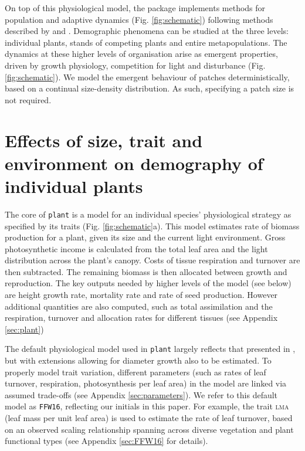 \documentclass[a4paper,11pt]{article}
\newcommand{\plant}{\texttt{plant}}
\begin{document}
On top of this physiological model, the package implements methods for
population and adaptive dynamics (Fig.  \ref{fig:schematic}) following methods
described by \citet{Falster-2011} and \citet{Falster-2015}. Demographic
phenomena can be studied at the three levels: individual plants, stands of
competing plants and entire metapopulations. The dynamics at these higher
levels of organisation arise as emergent properties, driven by growth
physiology, competition for light and disturbance (Fig.  \ref{fig:schematic}).
We model the emergent behaviour of patches deterministically, based on a
continual  size-density distribution. As such, specifying a patch size
is not required.

\section{Effects of size, trait and environment on demography of individual plants}

The core of {\plant} is a model for an individual species'
physiological strategy as specified by its traits
(Fig. \ref{fig:schematic}a). This model estimates rate of biomass
production for a plant, given its size and the current light
environment. Gross photosynthetic income is calculated from the total
leaf area and the light distribution across the plant's canopy. Costs
of tissue respiration and turnover are then subtracted. The remaining
biomass is then allocated between growth and reproduction.  The key
outputs needed by higher levels of the model (see below) are height
growth rate, mortality rate and rate of seed production.  However
additional quantities are also computed, such as total assimilation
and the respiration, turnover and allocation rates for different
tissues (see Appendix \ref{sec:plant})

The default physiological model used in {\plant} largely reflects that
presented in \citet{Falster-2011,Falster-2015}, but with extensions
allowing for diameter growth also to be estimated. To properly model
trait variation, different parameters (such as rates of leaf turnover,
respiration, photosynthesis per leaf area) in the model are linked via
assumed trade-offs (see Appendix \ref{sec:parameters}).  We refer to
this default model as \texttt{FFW16}, reflecting our initials in this
paper. For example, the trait
\textsc{lma} (leaf mass per unit leaf area) is used to estimate the
rate of leaf turnover, based on an observed scaling relationship
spanning across diverse vegetation and plant functional types
\citep{Wright-2004} (see Appendix \ref{sec:FFW16} for details).
\end{document}
